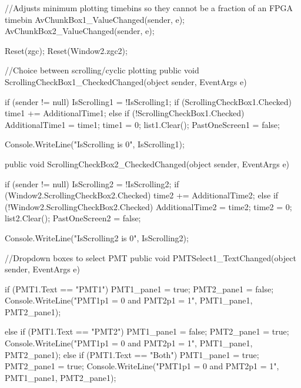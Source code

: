 {{{            //Adjusts minimum plotting timebins so they cannot be a fraction of an FPGA timebin
            AvChunkBox1_ValueChanged(sender, e);
            AvChunkBox2_ValueChanged(sender, e);

            Reset(zgc);
            Reset(Window2.zgc2);

        }


        //Choice between scrolling/cyclic plotting
        public void ScrollingCheckBox1_CheckedChanged(object sender, EventArgs e)
        {
            if (sender != null) IsScrolling1 = !IsScrolling1;
            if (ScrollingCheckBox1.Checked)
            {
                time1 += AdditionalTime1;
            }
            else if (!ScrollingCheckBox1.Checked)
            {
                AdditionalTime1 = time1;
                time1 = 0;
                list1.Clear();
                PastOneScreen1 = false;
            }

            Console.WriteLine("IsScrolling is {0}", IsScrolling1);
        }
        public void ScrollingCheckBox2_CheckedChanged(object sender, EventArgs e)
        {
            if (sender != null) IsScrolling2 = !IsScrolling2;
            if (Window2.ScrollingCheckBox2.Checked)
            {
                time2 += AdditionalTime2;
            }
            else if (!Window2.ScrollingCheckBox2.Checked)
            {
                AdditionalTime2 = time2;
                time2 = 0;
                list2.Clear();
                PastOneScreen2 = false;
            }

            Console.WriteLine("IsScrolling2 is {0}", IsScrolling2);
        }
       
        //Dropdown boxes to select PMT
        public void PMTSelect1_TextChanged(object sender, EventArgs e)
        {
            if (PMT1.Text == "PMT1")
            {
                PMT1_pane1 = true;
                PMT2_pane1 = false;
                Console.WriteLine("PMT1p1 = {0} and PMT2p1 = {1}", PMT1_pane1, PMT2_pane1);
            }

            else if (PMT1.Text == "PMT2")
            {
                PMT1_pane1 = false;
                PMT2_pane1 = true;
                Console.WriteLine("PMT1p1 = {0} and PMT2p1 = {1}", PMT1_pane1, PMT2_pane1);
            }
            else if (PMT1.Text == "Both")
            {
                PMT1_pane1 = true;
                PMT2_pane1 = true;
                Console.WriteLine("PMT1p1 = {0} and PMT2p1 = {1}", PMT1_pane1, PMT2_pane1);
            }

}}}
